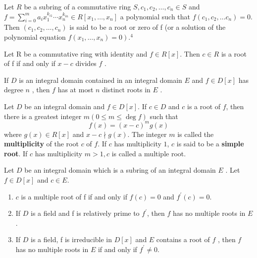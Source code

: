 \begin{definition}
    Let $R$ be a subring of a commutative ring $S, c_1, c_2, \ldots, c_{n} \in S$ and $f=\sum_{i=0}^m a_i x_1^{k_{i 1}} \cdots x_n^{k_{i n}} \in R\left[x_1, \ldots, x_{n}\right]$ a polynomial such that $f\left(c_1, c_2, \ldots c_{n}\right)=0$. Then $\left(c_1, c_2, \ldots, c_{n}\right)$ is said to be a root or zero of f (or a solution of the polynomial equation $\left.f\left(x_1, \ldots, x_{n}\right)=0\right) .^4$


\end{definition}

\begin{theorem}
    Let R be a commutative ring with identity and $f \in R[x]$. Then $c \in R$ is a root of f if and only if $x-c$ divides $f$ .
\end{theorem}


\begin{theorem}
    If $D$ is an integral domain contained in an integral domain $E$ and $f \in D[x]$ has degree $n$ , then $f$ has at most $n$ distinct roots in $E$ .
\end{theorem}



\begin{definition}
    Let $D$ be an integral domain and $f \in D[x]$.
    If $c \in D$ and $c$ is a root of $f$, then there is a greatest integer $m(0 \leq m \leq \operatorname{deg} f)$ such that
    \begin{equation*}
        f(x)=(x-c)^m g(x)
    \end{equation*}
    where $g(x) \in R[x]$ and $x-c \nmid g(x)$.
    The integer $m$ is called the \textbf{multiplicity} of the root $c$ of $f$.
    If $c$ has multiplicity $1$, $c$ is said to be a \textbf{simple root}.
    If $c$ has multiplicity $m>1, c$ is called a multiple root.
\end{definition}

\begin{theorem}
    Let $D$ be an integral domain which is a subring of an integral domain $E$ . Let $f \in D[x]$ and $c \in E$.
    \begin{enumerate}
        \item
              $c$ is a multiple root of f if and only if $f(c)=0$ and $f^{\prime}(c)=0$.
        \item
              If $D$ is a field and f is relatively prime to $f^{\prime}$, then $f$ has no multiple roots in $E$.
        \item
              If $D$ is a field, f is irreducible in $D[x]$ and $E$ contains a root of $f$ , then $f$ has no multiple roots in $E$ if and only if $f^{\prime} \neq 0$.
    \end{enumerate}
\end{theorem}

